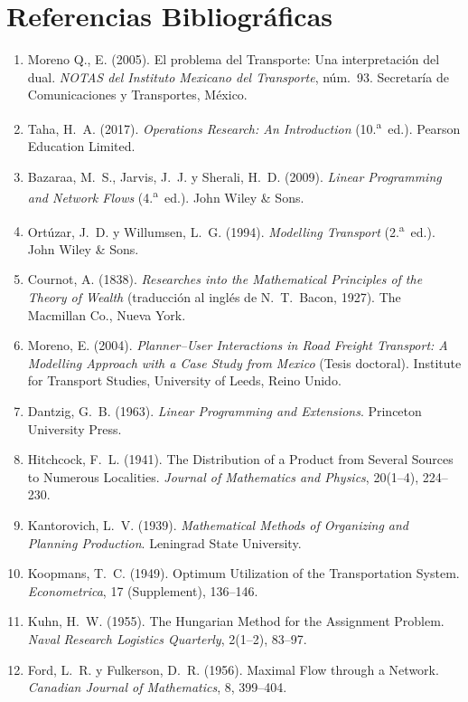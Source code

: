 \documentclass[10pt,letterpaper,twocolumn]{article}
\begin{document}
\section{Referencias Bibliográficas}

\small
\begin{enumerate}[leftmargin=1.2em,itemsep=0.4ex]
\item Moreno Q., E. (2005). El problema del Transporte: Una interpretación del dual. \emph{NOTAS del Instituto Mexicano del Transporte}, núm.~93. Secretaría de Comunicaciones y Transportes, México.
\item Taha, H.~A. (2017). \emph{Operations Research: An Introduction} (10.\textsuperscript{a}~ed.). Pearson Education Limited.
\item Bazaraa, M.~S., Jarvis, J.~J. y Sherali, H.~D. (2009). \emph{Linear Programming and Network Flows} (4.\textsuperscript{a}~ed.). John Wiley \& Sons.
\item Ortúzar, J.~D. y Willumsen, L.~G. (1994). \emph{Modelling Transport} (2.\textsuperscript{a}~ed.). John Wiley \& Sons.
\item Cournot, A. (1838). \emph{Researches into the Mathematical Principles of the Theory of Wealth} (traducción al inglés de N.~T.~Bacon, 1927). The Macmillan Co., Nueva York.
\item Moreno, E. (2004). \emph{Planner--User Interactions in Road Freight Transport: A Modelling Approach with a Case Study from Mexico} (Tesis doctoral). Institute for Transport Studies, University of Leeds, Reino Unido.
\item Dantzig, G.~B. (1963). \emph{Linear Programming and Extensions}. Princeton University Press.
\item Hitchcock, F.~L. (1941). The Distribution of a Product from Several Sources to Numerous Localities. \emph{Journal of Mathematics and Physics}, 20(1--4), 224--230.
\item Kantorovich, L.~V. (1939). \emph{Mathematical Methods of Organizing and Planning Production}. Leningrad State University.
\item Koopmans, T.~C. (1949). Optimum Utilization of the Transportation System. \emph{Econometrica}, 17 (Supplement), 136--146.
\item Kuhn, H.~W. (1955). The Hungarian Method for the Assignment Problem. \emph{Naval Research Logistics Quarterly}, 2(1--2), 83--97.
\item Ford, L.~R. y Fulkerson, D.~R. (1956). Maximal Flow through a Network. \emph{Canadian Journal of Mathematics}, 8, 399--404.

\end{enumerate}
\end{document}
